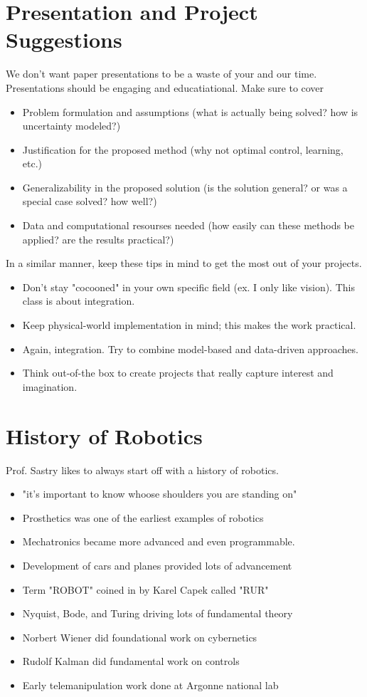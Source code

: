 \documentclass{report}
\begin{document}
\section{Presentation and Project Suggestions}
We don't want paper presentations to be a waste of your and our time. Presentations should be engaging and educatiational. Make sure to cover
\begin{itemize}
    \item Problem formulation and assumptions (what is actually being solved? how is uncertainty modeled?)
    \item Justification for the proposed method (why not optimal control, learning, etc.)
    \item Generalizability in the proposed solution (is the solution general? or was a special case solved? how well?)
    \item Data and computational resourses needed (how easily can these methods be applied? are the results practical?)
\end{itemize}

In a similar manner, keep these tips in mind to get the most out of your projects.
\begin{itemize}
    \item Don't stay "cocooned" in your own specific field (ex. I only like vision). This class is about integration.
    \item Keep physical-world implementation in mind; this makes the work practical.
    \item Again, integration. Try to combine model-based and data-driven approaches.
    \item Think out-of-the box to create projects that really capture interest and imagination.
\end{itemize}

\section{History of Robotics}
Prof. Sastry likes to always start off with a history of robotics. 
\begin{itemize}
    \item "it's important to know whoose shoulders you are standing on"
    \item Prosthetics was one of the earliest examples of robotics
    \item Mechatronics became more advanced and even programmable.
    \item Development of cars and planes provided lots of advancement
    \item Term "ROBOT" coined in by Karel Capek called "RUR"
    \item Nyquist, Bode, and Turing driving lots of fundamental theory
    \item Norbert Wiener did foundational work on cybernetics
    \item Rudolf Kalman did fundamental work on controls
    \item Early telemanipulation work done at Argonne national lab
\end{itemize}
\end{document}
